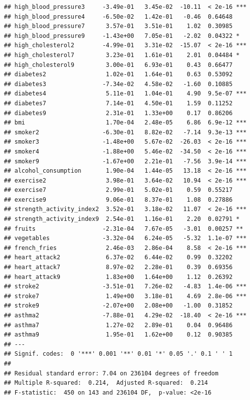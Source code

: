 \documentclass[
]{article}
\begin{document}
\begin{verbatim}
## high_blood_pressure3     -3.49e-01   3.45e-02  -10.11  < 2e-16 ***
## high_blood_pressure4     -6.50e-02   1.42e-01   -0.46  0.64648    
## high_blood_pressure7      3.57e-01   3.51e-01    1.02  0.30985    
## high_blood_pressure9     -1.43e+00   7.05e-01   -2.02  0.04322 *  
## high_cholesterol2        -4.99e-01   3.31e-02  -15.07  < 2e-16 ***
## high_cholesterol7         3.23e-01   1.61e-01    2.01  0.04484 *  
## high_cholesterol9         3.00e-01   6.93e-01    0.43  0.66477    
## diabetes2                 1.02e-01   1.64e-01    0.63  0.53092    
## diabetes3                -7.34e-02   4.58e-02   -1.60  0.10885    
## diabetes4                 5.11e-01   1.04e-01    4.90  9.5e-07 ***
## diabetes7                 7.14e-01   4.50e-01    1.59  0.11252    
## diabetes9                 2.31e-01   1.33e+00    0.17  0.86206    
## bmi                       1.70e-04   2.48e-05    6.86  6.9e-12 ***
## smoker2                  -6.30e-01   8.82e-02   -7.14  9.3e-13 ***
## smoker3                  -1.48e+00   5.67e-02  -26.03  < 2e-16 ***
## smoker4                  -1.88e+00   5.46e-02  -34.50  < 2e-16 ***
## smoker9                  -1.67e+00   2.21e-01   -7.56  3.9e-14 ***
## alcohol_consumption       1.90e-04   1.44e-05   13.18  < 2e-16 ***
## exercise2                 3.98e-01   3.64e-02   10.94  < 2e-16 ***
## exercise7                 2.99e-01   5.02e-01    0.59  0.55217    
## exercise9                 9.06e-01   8.37e-01    1.08  0.27886    
## strength_activity_index2  3.52e-01   3.18e-02   11.07  < 2e-16 ***
## strength_activity_index9  2.54e-01   1.16e-01    2.20  0.02791 *  
## fruits                   -2.31e-04   7.67e-05   -3.01  0.00257 ** 
## vegetables               -3.32e-04   6.24e-05   -5.32  1.1e-07 ***
## french_fries              2.46e-03   2.86e-04    8.58  < 2e-16 ***
## heart_attack2             6.37e-02   6.44e-02    0.99  0.32202    
## heart_attack7             8.97e-02   2.28e-01    0.39  0.69356    
## heart_attack9             1.83e+00   1.64e+00    1.12  0.26392    
## stroke2                  -3.51e-01   7.26e-02   -4.83  1.4e-06 ***
## stroke7                   1.49e+00   3.18e-01    4.69  2.8e-06 ***
## stroke9                  -2.07e+00   2.08e+00   -1.00  0.31852    
## asthma2                  -7.88e-01   4.29e-02  -18.40  < 2e-16 ***
## asthma7                   1.27e-02   2.89e-01    0.04  0.96486    
## asthma9                   1.95e-01   1.62e+00    0.12  0.90385    
## ---
## Signif. codes:  0 '***' 0.001 '**' 0.01 '*' 0.05 '.' 0.1 ' ' 1
## 
## Residual standard error: 7.04 on 236104 degrees of freedom
## Multiple R-squared:  0.214,  Adjusted R-squared:  0.214 
## F-statistic:  450 on 143 and 236104 DF,  p-value: <2e-16
\end{verbatim}
\end{document}

